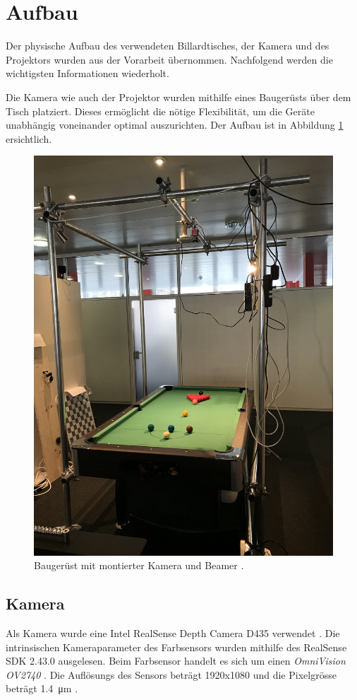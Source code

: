 \section{Aufbau}
Der physische Aufbau des verwendeten Billardtisches, der Kamera und des Projektors wurden aus der Vorarbeit \cite{project2:aufbau} übernommen.
Nachfolgend werden die wichtigsten Informationen wiederholt.

Die Kamera wie auch der Projektor wurden mithilfe eines Baugerüsts über dem Tisch platziert.
Dieses ermöglicht die nötige Flexibilität, um die Geräte unabhängig voneinander optimal auszurichten.
Der Aufbau ist in Abbildung \ref{fig:construction} ersichtlich.

\begin{figure}[h!]
    \begin{center}
        \includegraphics[width=0.6\linewidth]{../common/03_billiard_ai/resources/table.jpg}
    \end{center}
    \caption{Baugerüst mit montierter Kamera und Beamer \cite{project2:aufbau}.}
    \label{fig:construction}
\end{figure}

\subsection{Kamera}\label{kap:camera}

Als Kamera wurde eine Intel RealSense Depth Camera D435 verwendet \cite{intel:realsense_d435}.
Die intrinsischen Kameraparameter des Farbsensors wurden mithilfe des RealSense SDK 2.43.0 \cite{github:realsense_sdk} ausgelesen.
Beim Farbsensor handelt es sich um einen \emph{OmniVision OV2740} \cite{intel:realsense_d435_datasheet}.
Die Auflösungs des Sensors beträgt 1920x1080 und die Pixelgrösse beträgt \SI{1.4}{\micro\metre} \cite{omnivision:ov2740}.

